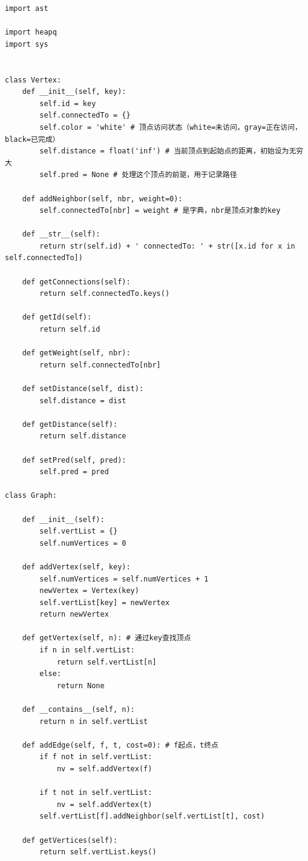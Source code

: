\documentclass[10pt,a4paper,fontset=none]{ctexart}
\begin{document}
\begin{lstlisting}[style=py,caption={最终可用代码（对话来源）}]
import ast

import heapq
import sys


class Vertex:
    def __init__(self, key):
        self.id = key
        self.connectedTo = {}
        self.color = 'white' # 顶点访问状态（white=未访问，gray=正在访问，black=已完成）
        self.distance = float('inf') # 当前顶点到起始点的距离，初始设为无穷大
        self.pred = None # 处理这个顶点的前驱，用于记录路径
 
    def addNeighbor(self, nbr, weight=0):
        self.connectedTo[nbr] = weight # 是字典，nbr是顶点对象的key

    def __str__(self):
        return str(self.id) + ' connectedTo: ' + str([x.id for x in self.connectedTo])

    def getConnections(self):
        return self.connectedTo.keys()

    def getId(self):
        return self.id

    def getWeight(self, nbr):
        return self.connectedTo[nbr]
    
    def setDistance(self, dist):
        self.distance = dist

    def getDistance(self):
        return self.distance

    def setPred(self, pred):
        self.pred = pred

class Graph:

    def __init__(self):
        self.vertList = {}
        self.numVertices = 0

    def addVertex(self, key):
        self.numVertices = self.numVertices + 1
        newVertex = Vertex(key)
        self.vertList[key] = newVertex
        return newVertex

    def getVertex(self, n): # 通过key查找顶点
        if n in self.vertList:
            return self.vertList[n]
        else:
            return None

    def __contains__(self, n):
        return n in self.vertList
    
    def addEdge(self, f, t, cost=0): # f起点，t终点
        if f not in self.vertList:
            nv = self.addVertex(f)

        if t not in self.vertList:
            nv = self.addVertex(t)
        self.vertList[f].addNeighbor(self.vertList[t], cost)

    def getVertices(self):
        return self.vertList.keys()


\end{lstlisting}
\end{document}
